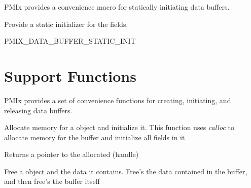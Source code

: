 \ac{PMIx} provides a convenience macro for statically initiating data buffers.


Provide a static initializer for the  fields.

\cspecificstart
\begin{codepar}
PMIX_DATA_BUFFER_STATIC_INIT
\end{codepar}
\cspecificend


\section{Support Functions}
\label{chap:datamgt:functions}

\ac{PMIx} provides a set of convenience functions for creating, initiating, and releasing data buffers.


Allocate memory for a  object and initialize it.
This function uses \textit{calloc} to allocate memory for the buffer and initialize all fields in it


Returns a pointer to the allocated  (handle)



Free a  object and the data it contains.
Free's the data contained in the buffer, and then free's the buffer itself


\begin{arglist}
\end{arglist}



